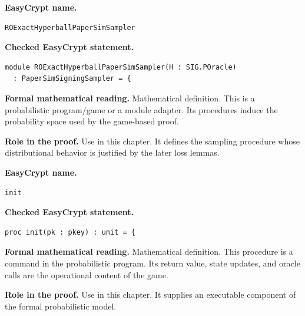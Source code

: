 \begin{formaldefinition}
\noindent\textbf{EasyCrypt name.}
\begin{lstlisting}[language=EasyCrypt,basicstyle=\ttfamily\scriptsize]
ROExactHyperballPaperSimSampler
\end{lstlisting}
\noindent\textbf{Checked EasyCrypt statement.}
\begin{lstlisting}[language=EasyCrypt,basicstyle=\ttfamily\scriptsize]
module ROExactHyperballPaperSimSampler(H : SIG.POracle)
  : PaperSimSigningSampler = {
\end{lstlisting}
\noindent\textbf{Formal mathematical reading.}
Mathematical definition. This is a probabilistic program/game or a module adapter.  Its procedures induce the probability space used by the game-based proof.

\noindent\textbf{Role in the proof.}
Use in this chapter. It defines the sampling procedure whose distributional behavior is justified by the later loss lemmas.

\end{formaldefinition}

\begin{formaldefinition}
\noindent\textbf{EasyCrypt name.}
\begin{lstlisting}[language=EasyCrypt,basicstyle=\ttfamily\scriptsize]
init
\end{lstlisting}
\noindent\textbf{Checked EasyCrypt statement.}
\begin{lstlisting}[language=EasyCrypt,basicstyle=\ttfamily\scriptsize]
proc init(pk : pkey) : unit = {
\end{lstlisting}
\noindent\textbf{Formal mathematical reading.}
Mathematical definition. This procedure is a command in the probabilistic program.  Its return value, state updates, and oracle calls are the operational content of the game.

\noindent\textbf{Role in the proof.}
Use in this chapter. It supplies an executable component of the formal probabilistic model.

\end{formaldefinition}

